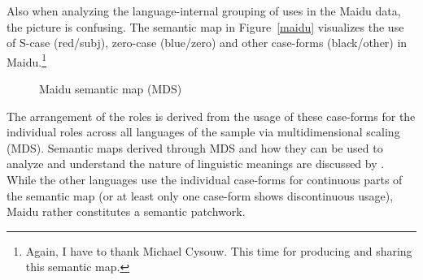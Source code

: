 Also when analyzing the language-internal grouping of uses in the Maidu data, the picture is confusing. 
The semantic map in Figure~\vref{maidu} visualizes the use of S-case (red/subj), zero-case
(blue/zero) and other case-forms (black/other) in Maidu.\footnote{Again, I have to thank
  Michael Cysouw. This time for producing and sharing this semantic map.}  
\begin{figure}[h,t,b] \centering {}
\caption{Maidu semantic map (MDS)}\label{maidu}
\end{figure}
The arrangement of the roles is derived from the usage of these case-forms for the individual roles across all languages of the sample via multidimensional scaling (MDS). 
Semantic maps derived through MDS and how they can be used to analyze and understand the nature of linguistic meanings are discussed by \citet{Cysouw:2010}.
While the other languages use the individual case-forms for continuous parts of the semantic map (or at least only one case-form shows discontinuous usage), Maidu rather constitutes a semantic patchwork.  


